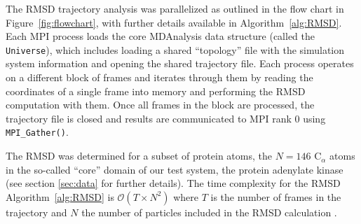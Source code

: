 The RMSD trajectory analysis was parallelized as outlined in the flow chart in Figure~\ref{fig:flowchart}, with further details available in Algorithm~\ref{alg:RMSD}.
Each MPI process loads the core MDAnalysis data structure (called the \texttt{Universe}), which includes loading a shared ``topology'' file with the simulation system information and opening the shared trajectory file.
Each process operates on a different block of frames and iterates through them by reading the coordinates of a single frame into memory and performing the RMSD computation with them.
Once all frames in the block are processed, the trajectory file is closed and results are communicated to MPI rank 0 using \texttt{MPI\_Gather()}.

The RMSD was determined for a subset of protein atoms, the $N=146$  C$_{\alpha}$ atoms in the so-called ``core'' domain of our test system, the protein adenylate kinase \cite{Seyler:2014il} (see section \ref{sec:data} for further details).
The time complexity for the RMSD Algorithm~\ref{alg:RMSD} is $\mathcal{O}(T \times N^{2})$ where $T$ is the number of frames in the trajectory and $N$ the number of particles included in the RMSD calculation \cite{Liu:2010kx}.

